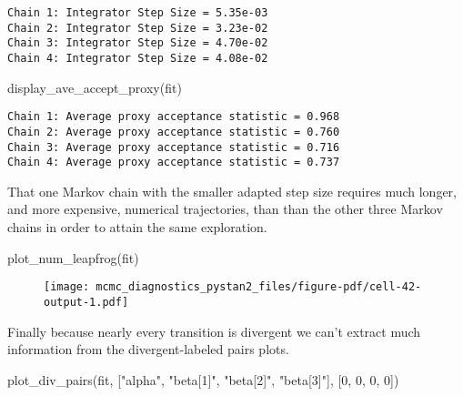 \documentclass[
  letterpaper,
  DIV=11,
  numbers=noendperiod]{scrartcl}
\newenvironment{Shaded}{\begin{snugshade}}{\end{snugshade}}
\newcommand{\DecValTok}[1]{\textcolor[rgb]{0.68,0.00,0.00}{#1}}
\newcommand{\NormalTok}[1]{\textcolor[rgb]{0.00,0.23,0.31}{#1}}
\newcommand{\StringTok}[1]{\textcolor[rgb]{0.13,0.47,0.30}{#1}}
\begin{document}
\begin{verbatim}
Chain 1: Integrator Step Size = 5.35e-03
Chain 2: Integrator Step Size = 3.23e-02
Chain 3: Integrator Step Size = 4.70e-02
Chain 4: Integrator Step Size = 4.08e-02
\end{verbatim}

\begin{Shaded}
\begin{Highlighting}[]
\NormalTok{display\_ave\_accept\_proxy(fit)}
\end{Highlighting}
\end{Shaded}

\begin{verbatim}
Chain 1: Average proxy acceptance statistic = 0.968
Chain 2: Average proxy acceptance statistic = 0.760
Chain 3: Average proxy acceptance statistic = 0.716
Chain 4: Average proxy acceptance statistic = 0.737
\end{verbatim}

That one Markov chain with the smaller adapted step size requires much
longer, and more expensive, numerical trajectories, than than the other
three Markov chains in order to attain the same exploration.

\begin{Shaded}
\begin{Highlighting}[]
\NormalTok{plot\_num\_leapfrog(fit)}
\end{Highlighting}
\end{Shaded}

\begin{figure}[H]

{\centering \texttt{[image: mcmc\_diagnostics\_pystan2\_files/figure-pdf/cell-42-output-1.pdf]}

}

\end{figure}

Finally because nearly every transition is divergent we can't extract
much information from the divergent-labeled pairs plots.

\begin{Shaded}
\begin{Highlighting}[]
\NormalTok{plot\_div\_pairs(fit,}
\NormalTok{               [}\StringTok{"alpha"}\NormalTok{, }\StringTok{"beta[1]"}\NormalTok{, }\StringTok{"beta[2]"}\NormalTok{, }\StringTok{"beta[3]"}\NormalTok{],}
\NormalTok{               [}\DecValTok{0}\NormalTok{, }\DecValTok{0}\NormalTok{, }\DecValTok{0}\NormalTok{, }\DecValTok{0}\NormalTok{])}
\end{Highlighting}
\end{Shaded}
\end{document}
